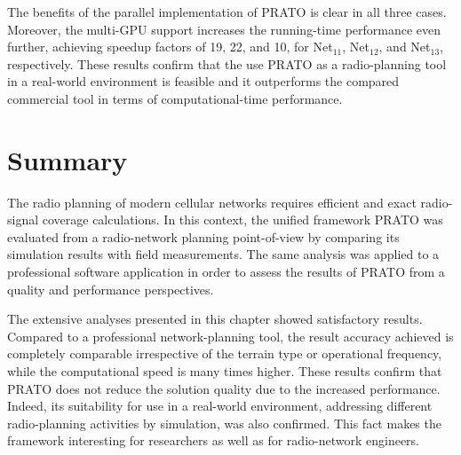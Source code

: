 The benefits of the parallel implementation of PRATO is clear in all
three cases. Moreover, the multi-GPU support increases the running-time
performance even further, achieving speedup factors of 19, 22, and
10, for Net$_{11}$, Net$_{12}$, and Net$_{13}$, respectively. These
results confirm that the use PRATO as a radio-planning tool in a real-world
environment is feasible and it outperforms the compared commercial
tool in terms of computational-time performance.


\section{Summary}

The radio planning of modern cellular networks requires efficient
and exact radio-signal coverage calculations. In this context, the
unified framework PRATO was evaluated from a radio-network planning
point-of-view by comparing its simulation results with field measurements.
The same analysis was applied to a professional software application
in order to assess the results of PRATO from a quality and performance
perspectives.

The extensive analyses presented in this chapter showed satisfactory
results. Compared to a professional network-planning tool, the result
accuracy achieved is completely comparable irrespective of the terrain
type or operational frequency, while the computational speed is many
times higher. These results confirm that PRATO does not reduce the
solution quality due to the increased performance. Indeed, its suitability
for use in a real-world environment, addressing different radio-planning
activities by simulation, was also confirmed. This fact makes the
framework interesting for researchers as well as for radio-network
engineers.
